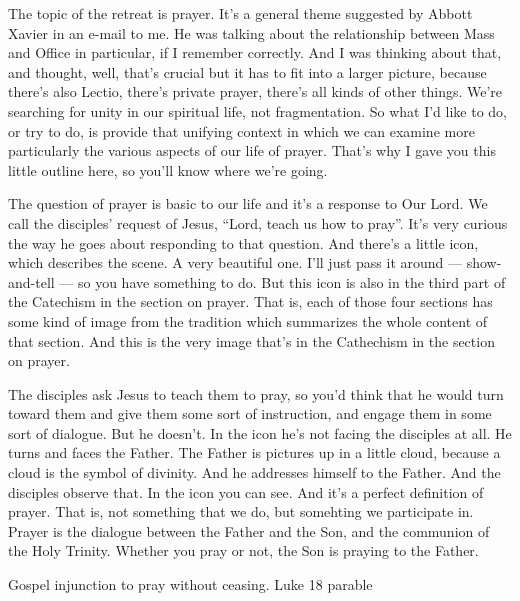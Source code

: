 \documentclass[10pt,a5paper]{book}
\begin{document}
The topic of the retreat is prayer. It's a general theme suggested by Abbott Xavier in an e-mail to me. He was talking about the relationship between Mass and Office in particular, if I remember correctly. And I was thinking about that, and thought, well, that's crucial but it has to fit into a larger picture, because there's also Lectio, there's private prayer, there's all kinds of other things. We're searching for unity in our spiritual life, not fragmentation. So what I'd like to do, or try to do, is provide that unifying context in which we can examine more particularly the various aspects of our life of prayer. That's why I gave you this little outline here, so you'll know where we're going.

The question of prayer is basic to our life and it's a response to Our Lord. We call the disciples' request of Jesus, ``Lord, teach us how to pray''.  It's very curious the way he goes about responding to that question. And there's a little icon, which describes the scene. A very beautiful one. I'll just pass it around --- show-and-tell --- so you have something to do. But this icon is also in the third part of the Catechism in the section on prayer. That is, each of those four sections has some kind of image from the tradition which summarizes the whole content of that section. And this is the very image that's in the Cathechism in the section on prayer.

The disciples ask Jesus to teach them to pray, so you'd think that he would turn toward them and give them some sort of instruction, and engage them in some sort of dialogue. But he doesn't. In the icon he's not facing the disciples at all. He turns and faces the Father. The Father is pictures up in a little cloud, because a cloud is the symbol of divinity. And he addresses himself to the Father. And the disciples observe that. In the icon you can see.    And it's a perfect definition of prayer. That is, not something that we do, but somehting we participate in. Prayer is the dialogue between the Father and the Son, and the communion of the Holy Trinity. Whether you pray or not, the Son is praying to the Father.

Gospel injunction to pray without ceasing. Luke 18 parable
\end{document}
